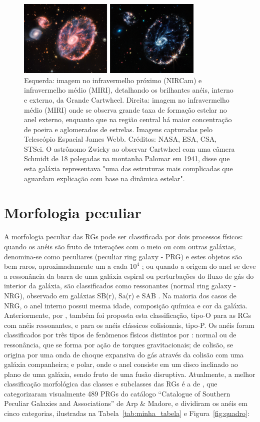 \begin{figure}
  \centering 
  \includegraphics[width=0.8\textwidth]{Imagens/Cartwheel03.PNG} 
  \caption[Gálaxia Cartwheel.]{Esquerda: imagem no infravermelho próximo (NIRCam) e infravermelho médio (MIRI), detalhando os brilhantes anéis, interno e externo, da Grande Cartwheel. Direita: imagem no infravermelho médio (MIRI) onde se observa grande taxa de formação estelar no anel externo, enquanto que na região central há maior concentração de poeira e aglomerados de estrelas. Imagens capturadas pelo Telescópio Espacial James Webb. Créditos: NASA, ESA, CSA, STSci. O astrônomo Zwicky ao observar Cartwheel com uma câmera Schmidt de 18 polegadas na montanha Palomar em 1941, disse que esta galáxia representava "uma das estruturas mais complicadas que aguardam explicação com base na dinâmica estelar".}
  \label{fig:cartwheel} 
\end{figure}


\section{Morfologia peculiar}

A morfologia peculiar das RGs pode ser classificada por dois processos físicos: quando os anéis são fruto de interações com o meio ou com outras galáxias, denomina-se como peculiares (peculiar ring galaxy - PRG) e estes objetos são bem raros, aproximadamente um a cada $10^\text{4}$ \cite{1987bin}; ou quando a origem do anel se deve a ressonância da barra de uma galáxia espiral ou perturbações do fluxo de gás do interior da galáxia, são classificados como ressonantes (normal ring galaxy - NRG), observado em galáxias SB(r), Sa(r) e SAB \cite{1998abans, 1995Buta}. Na maioria dos casos de NRG, o anel interno possui mesma idade, composição química e cor da galáxia. Anteriormente, por  , também foi proposta esta classificação, tipo-O para as RGs com anéis ressonantes, e para os anéis clássicos colisionais, tipo-P. Os anéis foram classificados por três tipos de fenômenos físicos distintos por : normal ou de ressonância, que se forma por ação de torques gravitacionais; de colisão, se origina por uma onda de choque expansiva do gás através da colisão com uma galáxia companheira; e polar, onde o anel consiste em um disco inclinado ao plano de uma galáxia, sendo fruto de uma fusão disruptiva. Atualmente, a melhor classificação morfológica das classes e subclasses das RGs é a de , que categorizaram visualmente 489 PRGs do catálogo “Catalogue of Southern
Peculiar Galaxies and Associations” de Arp \& Madore, e dividiram os anéis em cinco categorias, ilustradas na Tabela~\ref{tab:minha_tabela} e Figura~\ref{fig:quadro}: 

